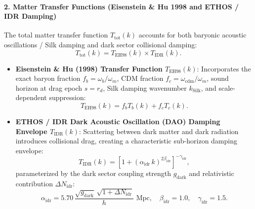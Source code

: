 \documentclass[11pt,a4paper]{article}
\theoremstyle{definition}
\begin{document}
\paragraph{2. Matter Transfer Functions (Eisenstein \& Hu 1998 and ETHOS / IDR Damping)}
The total matter transfer function $T_{\mathrm{tot}}(k)$ accounts for both baryonic acoustic oscillations / Silk damping and dark sector collisional damping:
\begin{equation}
T_{\mathrm{tot}}(k) = T_{\mathrm{EH98}}(k) \times T_{\mathrm{IDR}}(k).
\end{equation}
\begin{itemize}
    \item \textbf{Eisenstein \& Hu (1998) Transfer Function $T_{\mathrm{EH98}}(k)$}:
    Incorporates the exact baryon fraction $f_b = \omega_b / \omega_m$, CDM fraction $f_c = \omega_{\mathrm{cdm}} / \omega_m$, sound horizon at drag epoch $s = r_d$, Silk damping wavenumber $k_{\mathrm{Silk}}$, and scale-dependent suppression:
    \begin{equation}
    T_{\mathrm{EH98}}(k) = f_b T_b(k) + f_c T_c(k).
    \end{equation}
    \item \textbf{ETHOS / IDR Dark Acoustic Oscillation (DAO) Damping Envelope $T_{\mathrm{IDR}}(k)$}:
    Scattering between dark matter and dark radiation introduces collisional drag, creating a characteristic sub-horizon damping envelope:
    \begin{equation}
    T_{\mathrm{IDR}}(k) = \left[ 1 + \left( \alpha_{\mathrm{idr}}\,k \right)^{2\beta_{\mathrm{idr}}} \right]^{-\gamma_{\mathrm{idr}}},
    \end{equation}
    parameterized by the dark sector coupling strength $g_{\mathrm{dark}}$ and relativistic contribution $\Delta N_{\mathrm{idr}}$:
    \begin{equation}
    \alpha_{\mathrm{idr}} = 5.70\,\frac{\sqrt{g_{\mathrm{dark}}}\,\sqrt{1 + \Delta N_{\mathrm{idr}}}}{h}\text{ Mpc}, \quad \beta_{\mathrm{idr}} = 1.0, \quad \gamma_{\mathrm{idr}} = 1.5.
    \end{equation}
\end{itemize}
\end{document}
